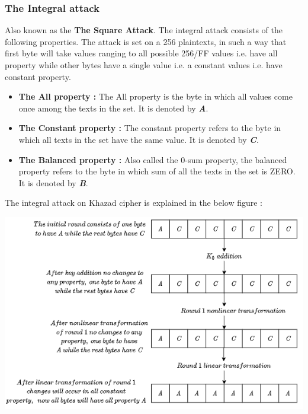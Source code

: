 \documentclass[preprint]{transcrypto}
\begin{document}
\subsubsection{The Integral attack}
Also known as the \textbf{The Square Attack}. The integral attack consists of the following properties.
The attack is set on a
256 plaintexts, in such a way that first byte will take values ranging to all possible 256/FF values i.e. have all property
while other bytes have a single value i.e. a constant values i.e. have constant property.
\begin{itemize}
    \item \textbf{The All property : }The All property is the byte in which all values come once among the texts in the set. It is denoted by \textit{\textbf{A}}.
    \item \textbf{The Constant property : }The constant property refers to the byte in which all texts in the set have the same value. It is denoted by \textit{\textbf{C}}.
    \item \textbf{The Balanced property : }Also called the 0-sum property, the balanced property refers to the byte in which sum of all the texts in the set is ZERO. It is denoted by \textit{\textbf{B}}.
\end{itemize}
The integral attack on Khazad cipher is explained in the below figure :\cite{1} \\
\begin{center}
    \includegraphics[scale=0.7]{Screenshots/r01.png}  
\end{center} \newpage
\end{document}
